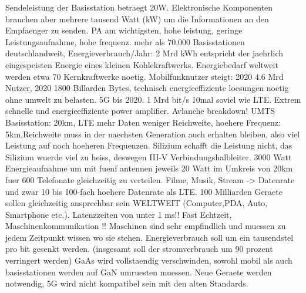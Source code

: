 Sendeleistung der Basisstation betraegt 20W. Elektronische Komponenten brauchen aber mehrere tausend Watt (kW) um die Informationen an den Empfaenger zu senden. PA am wichtigsten, hohe leistung, geringe Leistungsaufnahme, hohe frequenz. mehr als 70.000 Basisstationen deutschlandweit, Energieverbrauch/Jahr: 2 Mrd kWh entspricht der jaehrlich eingespeisten Energie eines kleinen Kohlekraftwerks. Energiebedarf weltweit werden etwa 70 Kernkraftwerke noetig. Mobilfunknutzer steigt: 2020 4.6 Mrd Nutzer, 2020 1800 Billarden Bytes, technisch energieeffiziente loesungen noetig ohne umwelt zu belasten. 5G bis 2020. 1 Mrd bit/s 10mal soviel wie LTE. Extrem schnelle und energieeffiziente power amplifier. Avlanche breakdown! UMTS Basisstation: 20km, LTE mehr Daten weniger Reichweite, hoehere Frequenz: 5km,Reichweite muss in der naechsten Generation auch erhalten bleiben, also viel Leistung auf noch hoeheren Frequenzen. Silizium schafft die Leistung nicht, das Silizium wuerde viel zu heiss, deswegen III-V Verbindungshalbleiter. 3000 Watt Energieaufnahme um mit fuenf antennen jeweils 20 Watt im Umkreis von 20km fuer 600 Telefonate gleichzeitig zu verteilen. Filme, Musik, Stream -> Datenrate und zwar 10 bis 100-fach hoehere Datenrate als LTE. 100 Milliarden Geraete sollen gleichzeitig ansprechbar sein WELTWEIT (Computer,PDA, Auto, Smartphone etc.). Latenzzeiten von unter 1 ms!! Fast Echtzeit, Maschinenkommunikation !! Maschinen sind sehr empfindlich und muessen zu jedem Zeitpunkt wissen wo sie stehen. Energieverbrauch soll um ein tausendstel pro bit gesenkt werden. (insgesamt soll der stromverbrauch um 90 prozent verringert werden) GaAs wird vollstaendig verschwinden, sowohl mobil als auch basisstationen werden auf GaN umruesten muessen. Neue Geraete werden notwendig, 5G wird nicht kompatibel sein mit den alten Standards. 